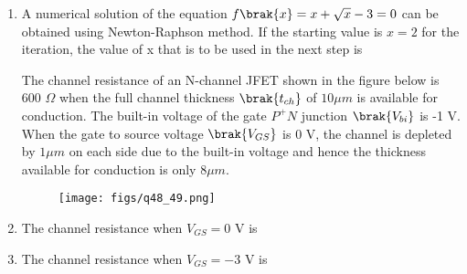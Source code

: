 \documentclass[a4paper, 11pt]{article}
\begin{document}
\begin{enumerate}
    \item A numerical solution of the equation $f\brak{x}=x+\sqrt{x}-3=0$ can be obtained using Newton-Raphson method. If the starting value is $x=2$ for the iteration, the value of x that is to be used in the next step is
    
    \begin{enumerate}
    \end{enumerate}
    \hfill{}
    
    The channel resistance of an N-channel JFET shown in the figure below is 600 $\Omega$ when the full channel thickness $\brak{t_{ch}}$ of $10 \mu m$ is available for conduction. The built-in voltage of the gate $P^{+}N$ junction $\brak{V_{bi}}$ is -1 V. When the gate to source voltage $\brak{V_{GS}}$ is 0 V, the channel is depleted by $1 \mu m$ on each side due to the built-in voltage and hence the thickness available for conduction is only $8 \mu m$.
    \begin{figure}[H]
        \centering
        \texttt{[image: figs/q48\_49.png]}
        \caption*{}
        \label{fig:q48_49}
    \end{figure}

    \item The channel resistance when $V_{GS}=0$ V is
    \begin{enumerate}
    \end{enumerate}
    
    \hfill{}

    \item The channel resistance when $V_{GS}=-3$ V is
    \begin{enumerate}
    \end{enumerate}
    

\end{enumerate}
\end{document}
